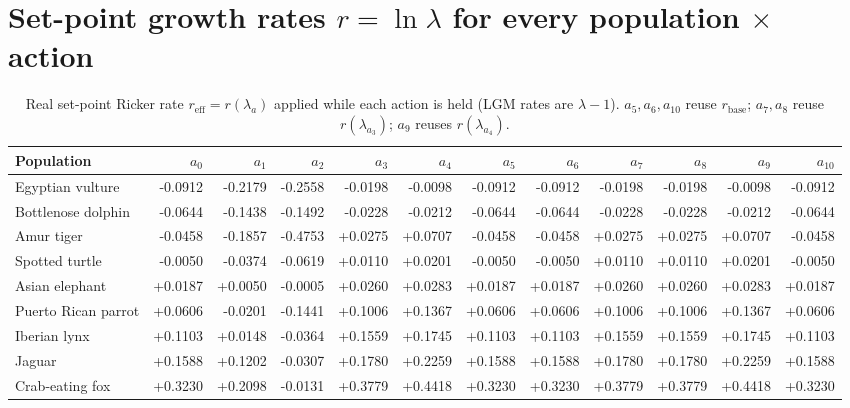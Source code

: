 \documentclass[11pt]{article}
\newcommand{\reff}{r_{\mathrm{eff}}}
\newcommand{\rbase}{r_{\mathrm{base}}}
\begin{document}
\section{Set-point growth rates $r=\ln\lambda$ for every population $\times$ action}
\label{app:r}
\begingroup
\scriptsize
\setlength{\tabcolsep}{2pt}
\renewcommand{\arraystretch}{0.95}
\begin{longtable}{@{}lrrrrrrrrrrr@{}}
\caption{Real set-point Ricker rate $\reff=r(\lambda_{a})$ applied while each action
is held (LGM rates are $\lambda-1$). $a_5,a_6,a_{10}$ reuse $\rbase$; $a_7,a_8$ reuse
$r(\lambda_{a_3})$; $a_9$ reuses $r(\lambda_{a_4})$.}\\
\toprule
Population & $a_0$ & $a_1$ & $a_2$ & $a_3$ & $a_4$ & $a_5$ & $a_6$ & $a_7$ & $a_8$ & $a_9$ & $a_{10}$ \\
\midrule
\endhead
\bottomrule
\endfoot

Egyptian vulture & -0.0912 & -0.2179 & -0.2558 & -0.0198 & -0.0098 & -0.0912 & -0.0912 & -0.0198 & -0.0198 & -0.0098 & -0.0912 \\
Bottlenose dolphin & -0.0644 & -0.1438 & -0.1492 & -0.0228 & -0.0212 & -0.0644 & -0.0644 & -0.0228 & -0.0228 & -0.0212 & -0.0644 \\
Amur tiger & -0.0458 & -0.1857 & -0.4753 & +0.0275 & +0.0707 & -0.0458 & -0.0458 & +0.0275 & +0.0275 & +0.0707 & -0.0458 \\
Spotted turtle & -0.0050 & -0.0374 & -0.0619 & +0.0110 & +0.0201 & -0.0050 & -0.0050 & +0.0110 & +0.0110 & +0.0201 & -0.0050 \\
Asian elephant & +0.0187 & +0.0050 & -0.0005 & +0.0260 & +0.0283 & +0.0187 & +0.0187 & +0.0260 & +0.0260 & +0.0283 & +0.0187 \\
Puerto Rican parrot & +0.0606 & -0.0201 & -0.1441 & +0.1006 & +0.1367 & +0.0606 & +0.0606 & +0.1006 & +0.1006 & +0.1367 & +0.0606 \\
Iberian lynx & +0.1103 & +0.0148 & -0.0364 & +0.1559 & +0.1745 & +0.1103 & +0.1103 & +0.1559 & +0.1559 & +0.1745 & +0.1103 \\
Jaguar & +0.1588 & +0.1202 & -0.0307 & +0.1780 & +0.2259 & +0.1588 & +0.1588 & +0.1780 & +0.1780 & +0.2259 & +0.1588 \\
Crab-eating fox & +0.3230 & +0.2098 & -0.0131 & +0.3779 & +0.4418 & +0.3230 & +0.3230 & +0.3779 & +0.3779 & +0.4418 & +0.3230 \\
\end{longtable}
\endgroup
\end{document}

